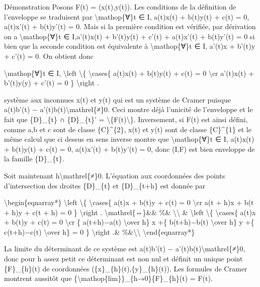 \documentclass[]{article}
\begin{document}
Démonstration Posons F(t) = (x(t),y(t)). Les conditions de la définition
de l'enveloppe se traduisent par \textbackslash{}mathop\{∀\}t ∈ I,
a(t)x(t) + b(t)y(t) + c(t) = 0, a(t)x'(t) + b(t)y'(t) = 0. Mais si la
première condition est vérifiée, par dérivation on a
\textbackslash{}mathop\{∀\}t ∈ I,a'(t)x(t) + b'(t)y(t) + c'(t) +
a(t)x'(t) + b(t)y'(t) = 0 si bien que la seconde condition est
équivalente à \textbackslash{}mathop\{∀\}t ∈ I, a'(t)x + b'(t)y + c'(t)
= 0. On obtient donc

\textbackslash{}mathop\{∀\}t ∈ I, \textbackslash{}left
\textbackslash{}\{ \textbackslash{}cases\{ a(t)x(t) + b(t)y(t) + c(t) =
0 \textbackslash{}cr a'(t)x(t) + b'(t)y(y) + c'(t) = 0 \}
\textbackslash{}right .

système aux inconnues x(t) et y(t) qui est un système de Cramer puisque
a(t)b'(t) − a'(t)b(t)\textbackslash{}mathrel\{≠\}0. Ceci montre déjà
l'unicité de l'enveloppe et le fait que \{D\}\_\{t\} ∩ \{D\}\_\{t\}' =
\textbackslash{}\{F(t)\textbackslash{}\}. Inversement, si F(t) est ainsi
défini, comme a,b et c sont de classe \{C\}\^{}\{2\}, x(t) et y(t) sont
de classe \{C\}\^{}\{1\} et le même calcul que ci dessus en sens inverse
montre que \textbackslash{}mathop\{∀\}t ∈ I, a(t)x(t) + b(t)y(t) + c(t)
= 0, a(t)x'(t) + b(t)y'(t) = 0, donc (I,F) est bien enveloppe de la
famille \{D\}\_\{t\}.

Soit maintenant h\textbackslash{}mathrel\{≠\}0. L'équation aux
coordonnées des points d'intersection des droites \{D\}\_\{t\} et
\{D\}\_\{t+h\} est donnée par

\textbackslash{}begin\{eqnarray*\} \textbackslash{}left
\textbackslash{}\{ \textbackslash{}cases\{ a(t)x + b(t)y + c(t) = 0
\textbackslash{}cr a(t + h)x + b(t + h)y + c(t + h) = 0 \}
\textbackslash{}right . \textbackslash{}mathrel\{⇔\}\&\& \%\&
\textbackslash{}\textbackslash{} \& \textbackslash{}left
\textbackslash{}\{ \textbackslash{}cases\{ a(t)x + b(t)y + c(t) = 0
\textbackslash{}cr \{ a(t+h)−a(t) \textbackslash{}over h\} x +\{
b(t+h)−b(t) \textbackslash{}over h\} y +\{ c(t+h)−c(t)
\textbackslash{}over h\} = 0 \} \textbackslash{}right .\&
\%\&\textbackslash{}\textbackslash{} \textbackslash{}end\{eqnarray*\}

La limite du déterminant de ce système est a(t)b'(t) −
a'(t)b(t)\textbackslash{}mathrel\{≠\}0, donc pour h assez petit ce
déterminant est non nul et définit un unique point \{F\}\_\{h\}(t) de
coordonnées (\{x\}\_\{h\}(t),\{y\}\_\{h\}(t)). Les formules de Cramer
montrent aussitôt que
\{\textbackslash{}mathop\{lim\}\}\_\{h→0\}\{F\}\_\{h\}(t) = F(t).
\end{document}
